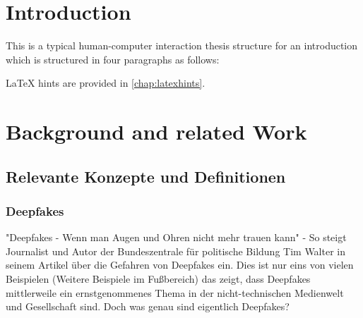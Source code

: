 %
%


\chapter{Introduction}
\label{sec:introduction}

This is a typical human-computer interaction thesis structure for an introduction which is structured in four paragraphs as follows:




LaTeX hints are provided in \autoref{chap:latexhints}.

\chapter{Background and related Work}
\section{Relevante Konzepte und Definitionen}
\subsection{Deepfakes}
"Deepfakes - Wenn man Augen und Ohren nicht mehr trauen kann" \cite{bildungDeepfakesWennMan2023} - 
So steigt Journalist und Autor der Bundeszentrale für politische Bildung Tim Walter in seinem Artikel über die Gefahren von Deepfakes ein. 
Dies ist nur eins von vielen Beispielen (Weitere Beispiele im Fußbereich) das zeigt, 
dass Deepfakes mittlerweile ein ernstgenommenes Thema in der nicht-technischen Medienwelt und Gesellschaft sind. 
Doch was genau sind eigentlich Deepfakes? 

